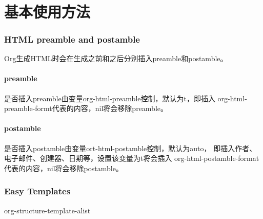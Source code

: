 ﻿\documentclass[a4paper,11pt]{article}
\begin{document}
  \tt %
  \pagestyle{header}
  \sybmaketitle
  \tableofcontents
  \newpage

  \pagestyle{main}
  \setcounter{page}{1}

  \part[基本使用方法]{基本使用方法}

  \section[HTML preamble and postamble]{HTML preamble and postamble}
  Org生成HTML时会在生成之前和之后分别插入preamble和postamble。

  \subsection[preamble]{preamble}
  是否插入preamble由变量org-html-preamble控制，默认为t，即插入
  org-html-preamble-formt代表的内容，nil将会移除preamble。

  \subsection[postamble]{postamble}
  是否插入postamble由变量ort-html-postamble控制，默认为auto，
  即插入作者、电子邮件、创建器、日期等，设置该变量为t将会插入
  org-html-postamble-format代表的内容，nil将会移除postamble。


  \section[Easy Templates]{Easy Templates}
  org-structure-template-alist

  
\end{document}
